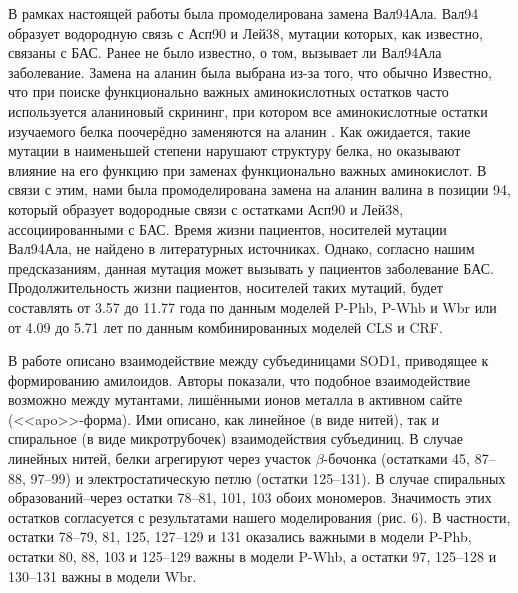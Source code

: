В рамках настоящей работы была промоделирована замена Вал94Ала. Вал94 образует водородную связь с Асп90 и Лей38, мутации которых, как известно, связаны с БАС. Ранее не было известно, о том, вызывает ли Вал94Ала заболевание. Замена на аланин была выбрана из-за того, что обычно
Известно, что при поиске функционально важных аминокислотных остатков часто используется аланиновый скрининг, при котором все аминокислотные остатки изучаемого белка поочерёдно заменяются на аланин \cite{Cunningham1989}. Как ожидается, такие мутации в наименьшей степени нарушают структуру белка, но оказывают влияние на его функцию при заменах функционально важных аминокислот. В связи с этим, нами была промоделирована замена на аланин валина в позиции 94,  который образует водородные связи с остатками Асп90 и Лей38, ассоциированными с БАС. Время жизни пациентов, носителей мутации Вал94Ала, не найдено в литературных источниках. Однако, согласно нашим предсказаниям, данная мутация может вызывать у пациентов заболевание БАС. Продолжительность жизни пациентов, носителей таких мутаций, будет составлять от 3.57 до 11.77 года по данным моделей P-Phb, P-Whb и Wbr или от 4.09 до 5.71 лет по данным комбинированных моделей CLS и CRF. 

В работе \cite{Elam2003} описано взаимодействие между субъединицами SOD1, приводящее к формированию амилоидов. Авторы показали, что подобное взаимодействие возможно между мутантами, лишёнными ионов металла в активном сайте (<<apo>>-форма). Ими описано, как линейное (в виде нитей), так и спиральное (в виде микротрубочек) взаимодействия субъединиц. В случае линейных нитей, белки агрегируют через участок $\beta$-бочонка (остатками 45, 87–88, 97–99) и электростатическую петлю (остатки 125–131). В случае спиральных образований--через остатки 78–81, 101, 103 обоих мономеров. Значимость этих остатков согласуется с результатами нашего моделирования (рис. 6). В частности, остатки 78–79, 81, 125, 127–129 и 131 оказались важными в модели P-Phb, остатки 80, 88, 103 и 125–129 важны в модели P-Whb, а остатки 97, 125–128 и 130–131 важны в модели Wbr. 

